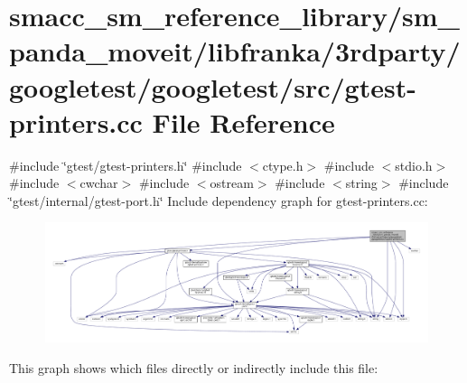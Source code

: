 \hypertarget{gtest-printers_8cc}{}\section{smacc\+\_\+sm\+\_\+reference\+\_\+library/sm\+\_\+panda\+\_\+moveit/libfranka/3rdparty/googletest/googletest/src/gtest-\/printers.cc File Reference}
\label{gtest-printers_8cc}
{\ttfamily \#include \char`\"{}gtest/gtest-\/printers.\+h\char`\"{}}\newline
{\ttfamily \#include $<$ctype.\+h$>$}\newline
{\ttfamily \#include $<$stdio.\+h$>$}\newline
{\ttfamily \#include $<$cwchar$>$}\newline
{\ttfamily \#include $<$ostream$>$}\newline
{\ttfamily \#include $<$string$>$}\newline
{\ttfamily \#include \char`\"{}gtest/internal/gtest-\/port.\+h\char`\"{}}\newline
Include dependency graph for gtest-\/printers.cc\+:
\nopagebreak
\begin{figure}[H]
\begin{center}
\leavevmode
\includegraphics[width=350pt]{gtest-printers_8cc__incl}
\end{center}
\end{figure}
This graph shows which files directly or indirectly include this file\+:
\nopagebreak
